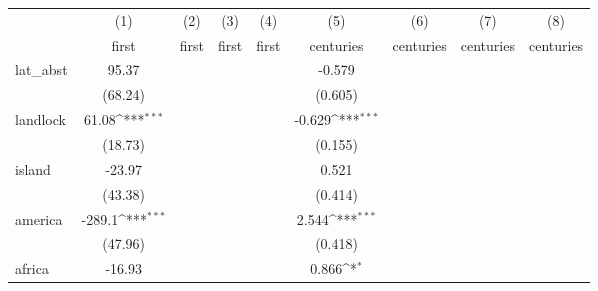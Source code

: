 {
\def\sym#1{\ifmmode^{#1}\else\(^{#1}\)\fi}
\begin{tabular}{l*{8}{c}}
\hline\hline
            &\multicolumn{1}{c}{(1)}&\multicolumn{1}{c}{(2)}&\multicolumn{1}{c}{(3)}&\multicolumn{1}{c}{(4)}&\multicolumn{1}{c}{(5)}&\multicolumn{1}{c}{(6)}&\multicolumn{1}{c}{(7)}&\multicolumn{1}{c}{(8)}\\
            &\multicolumn{1}{c}{first}&\multicolumn{1}{c}{first}&\multicolumn{1}{c}{first}&\multicolumn{1}{c}{first}&\multicolumn{1}{c}{centuries}&\multicolumn{1}{c}{centuries}&\multicolumn{1}{c}{centuries}&\multicolumn{1}{c}{centuries}\\
\hline
lat\_abst    &       95.37         &                     &                     &                     &      -0.579         &                     &                     &                     \\
            &     (68.24)         &                     &                     &                     &     (0.605)         &                     &                     &                     \\
[1em]
landlock    &       61.08\sym{***}&                     &                     &                     &      -0.629\sym{***}&                     &                     &                     \\
            &     (18.73)         &                     &                     &                     &     (0.155)         &                     &                     &                     \\
[1em]
island      &      -23.97         &                     &                     &                     &       0.521         &                     &                     &                     \\
            &     (43.38)         &                     &                     &                     &     (0.414)         &                     &                     &                     \\
[1em]
america     &      -289.1\sym{***}&                     &                     &                     &       2.544\sym{***}&                     &                     &                     \\
            &     (47.96)         &                     &                     &                     &     (0.418)         &                     &                     &                     \\
[1em]
africa      &      -16.93         &                     &                     &                     &       0.866\sym{*}  &                     &                     &                     \\

\end{tabular}}

